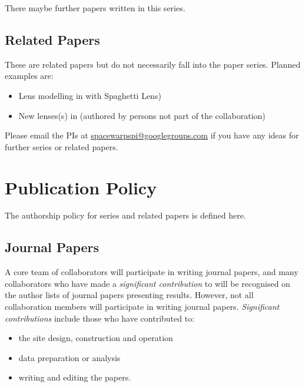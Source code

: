 \documentclass[a4paper]{article}
\begin{document}
There maybe further papers written in this series. \newline

\subsection{\sw Related Papers}
These are \sw related papers but do not necessarily fall into the \sw paper series. Planned examples are:
\begin{itemize}
\item Lens modelling in \sw with {\sc Spaghetti Lens})
\item New lenses(s) in \sw (authored by persons not part of the \sw collaboration)
\end{itemize}



Please email the \sw PIs at \href{mailto:spacewarpspi@googlegroups.com}{spacewarpspi@googlegroups.com} if you have any
ideas for further \sw series or related papers. 
 

\section{Publication Policy}
\label{sec:publ}


The authorship policy for \sw series and related papers is defined here.


\subsection{Journal Papers}
\label{sec:series}

A core team of collaborators will participate in writing journal papers, and
many collaborators who have made a \textit{significant contribution} to \sw
will be recognised on the author lists of journal papers presenting \sw
results.  However, not all collaboration members will participate in writing
journal papers.  \textit{Significant contributions} include those who have
contributed to:
\begin{itemize}
\item the site design, construction and operation
\item data preparation or analysis
\item writing and editing the papers. 
\end{itemize}
\end{document}
